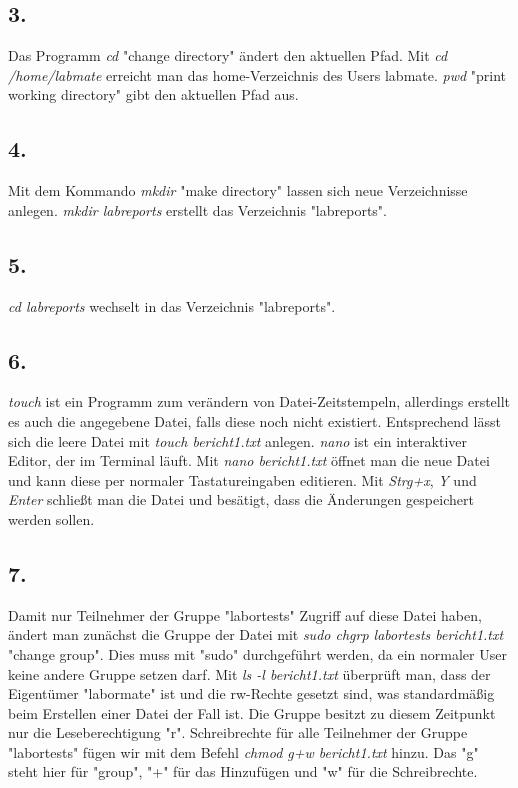 \documentclass[
    fontsize=10pt,
    headings=medium,
    parskip=half,           %
    bibliography=totoc,
    numbers=noenddot,       %
    open=any,               %
    a4paper,
    ]{scrreprt}
\begin{document}
\subsection*{3.}
Das Programm \emph{cd} "change directory" ändert den aktuellen Pfad. Mit \emph{cd /home/labmate} erreicht man das home-Verzeichnis des Users labmate.
\emph{pwd} "print working directory" gibt den aktuellen Pfad aus.

\subsection*{4.}
Mit dem Kommando \emph{mkdir} "make directory" lassen sich neue Verzeichnisse anlegen. \emph{mkdir labreports} erstellt das Verzeichnis "labreports".

\subsection*{5.}
\emph{cd labreports} wechselt in das Verzeichnis "labreports".

\subsection*{6.}
\emph{touch} ist ein Programm zum verändern von Datei-Zeitstempeln, allerdings erstellt es auch die angegebene Datei, falls diese noch nicht existiert. Entsprechend lässt sich die leere Datei mit \emph{touch bericht1.txt} anlegen.
\emph{nano} ist ein interaktiver Editor, der im Terminal läuft. Mit \emph{nano bericht1.txt} öffnet man die neue Datei und kann diese per normaler Tastatureingaben editieren. Mit \emph{Strg+x}, \emph{Y} und \emph{Enter} schließt man die Datei und besätigt, dass die Änderungen gespeichert werden sollen.

\subsection*{7.}
Damit nur Teilnehmer der Gruppe "labortests" Zugriff auf diese Datei haben, ändert man zunächst die Gruppe der Datei mit \emph{sudo chgrp labortests bericht1.txt} "change group". Dies muss mit "sudo" durchgeführt werden, da ein normaler User keine andere Gruppe setzen darf.
Mit \emph{ls -l bericht1.txt} überprüft man, dass der Eigentümer "labormate" ist und die rw-Rechte gesetzt sind, was standardmäßig beim Erstellen einer Datei der Fall ist. Die Gruppe besitzt zu diesem Zeitpunkt nur die Leseberechtigung "r". Schreibrechte für alle Teilnehmer der Gruppe "labortests" fügen wir mit dem Befehl \emph{chmod g+w bericht1.txt} hinzu. Das "g" steht hier für "group", "+" für das Hinzufügen und "w" für die Schreibrechte.
\end{document}
